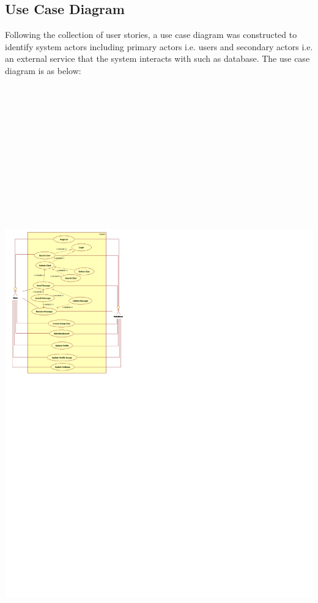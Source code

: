 \documentclass{article}
\begin{document}
\subsection {Use Case Diagram}
Following the collection of user stories, a use case diagram was constructed to identify system actors including primary actors i.e. users and secondary actors i.e. an external service that the system interacts with such as database. The use case diagram is as below: \newline 
\includegraphics [width=40cm, height=45cm] {useCase_hermes}
\end{document}
